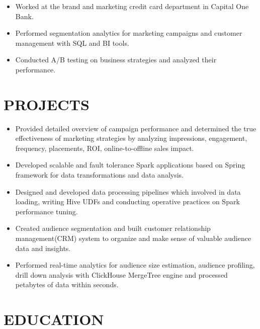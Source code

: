 \documentclass{resume}
\begin{document}
\begin{itemize}
  \item Worked at the brand and marketing credit card department in Capital One Bank.
  \item Performed segmentation analytics for marketing campaigns and customer management with SQL and BI tools.
  \item Conducted A/B testing on business strategies and analyzed their performance.
\end{itemize}

\section{PROJECTS}
\begin{itemize}
  \item Provided detailed overview of campaign performance and determined the true effectiveness of marketing strategies by analyzing impressions, engagement, frequency, placements, ROI, online-to-offline sales impact.
  \item Developed scalable and fault tolerance Spark applications based on Spring framework for data transformations and data analysis.
  \item Designed and developed data processing pipelines which involved in data loading, writing Hive UDFs and conducting operative practices on Spark performance tuning.
\end{itemize}

\begin{itemize}
  \item Created audience segmentation and built customer relationship management(CRM) system to organize and make sense of valuable audience data and insights.
  \item Performed real-time analytics for audience size estimation, audience profiling, drill down analysis with ClickHouse MergeTree engine and processed petabytes of data within seconds.
\end{itemize}

\section{EDUCATION}
\end{document}
